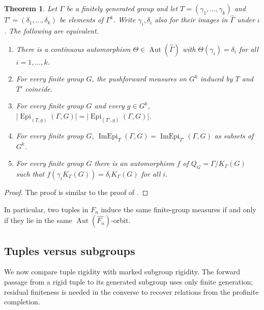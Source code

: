 \documentclass[11pt]{amsart}
\theoremstyle{plain}
\newtheorem{theorem}{Theorem}[section]
\theoremstyle{definition}
\newcommand{\Epi}{\operatorname{Epi}}
\newcommand{\Aut}{\operatorname{Aut}}
\newcommand{\ImEpi}{\operatorname{ImEpi}}
\begin{document}
\begin{theorem}\label{thm:tuple-char}
Let $\Gamma$ be a finitely generated group and let $T=(\gamma_1,\dots,\gamma_k)$
and $T'=(\delta_1,\dots,\delta_k)$ be elements of $\Gamma^{k}$.  Write
$\gamma_i,\delta_i$ also for their images in $\widehat\Gamma$ under $\iota$.
The following are equivalent.
\begin{enumerate}
\item There is a continuous automorphism $\Theta\in\Aut(\widehat\Gamma)$ with
      $\Theta(\gamma_i)=\delta_i$ for all $i=1,\dots,k$.
\item For every finite group $G$, the pushforward measures on $G^{k}$ induced by
      $T$ and $T'$ coincide.
\item For every finite group $G$ and every $g\in G^{k}$,
      $\bigl|\Epi_{(T,g)}(\Gamma,G)\bigr|=\bigl|\Epi_{(T',g)}(\Gamma,G)\bigr|$.
\item For every finite group $G$,
      $\ImEpi_T(\Gamma,G)=\ImEpi_{T'}(\Gamma,G)$ as subsets of $G^{k}$.
\item For every finite group $G$ there is an automorphism $f$ of
      $Q_G=\Gamma/K_\Gamma(G)$ such that
      $f(\gamma_iK_\Gamma(G))=\delta_iK_\Gamma(G)$ for all $i$.
\end{enumerate}
\end{theorem}

\begin{proof}
    The proof is similar to the proof of \cite[Theorem~2.2]{HMP}.
\end{proof}

In particular, two tuples in $F_n$ induce the same finite-group measures if
and only if they lie in the same $\Aut(\widehat{F_n})$-orbit.


\subsection{Tuples versus subgroups}\label{sec:tuple-vs-subgroup}


We now compare tuple rigidity with marked subgroup rigidity.  The forward
passage from a rigid tuple to its generated subgroup uses only finite
generation; residual finiteness is needed in the converse to recover relations
from the profinite completion.
\end{document}
